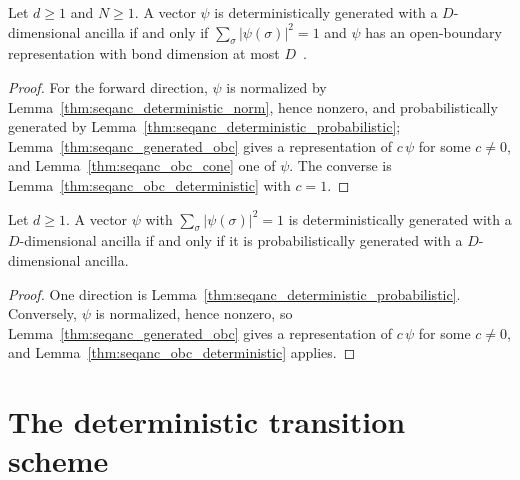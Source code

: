 \begin{theorem}
    \label{thm:seqanc_deterministic}
    \leanok
    Let $d\ge 1$ and $N\ge 1$. A vector $\psi$ is deterministically generated
    with a $D$-dimensional ancilla if and only if $\sum_\sigma|\psi(\sigma)|^2=1$
    and $\psi$ has an open-boundary representation with bond dimension at
    most $D$~\cite[Section~5,
        Theorem ``Sequential generation with ancilla'']{PerezGarcia2007Matrix}.
\end{theorem}
\begin{proof}
    \leanok
    For the forward direction, $\psi$ is normalized by
    Lemma~\ref{thm:seqanc_deterministic_norm}, hence nonzero, and
    probabilistically generated by
    Lemma~\ref{thm:seqanc_deterministic_probabilistic};
    Lemma~\ref{thm:seqanc_generated_obc} gives a representation of
    $c\,\psi$ for some $c\ne 0$, and Lemma~\ref{thm:seqanc_obc_cone} one of
    $\psi$. The converse is Lemma~\ref{thm:seqanc_obc_deterministic} with
    $c=1$.
\end{proof}

\begin{lemma}
    \label{thm:seqanc_det_iff_prob}
    \leanok
    Let $d\ge 1$. A vector $\psi$ with $\sum_\sigma|\psi(\sigma)|^2=1$ is
    deterministically generated with a $D$-dimensional ancilla if and only if
    it is probabilistically generated with a $D$-dimensional ancilla.
\end{lemma}
\begin{proof}
    \leanok
    One direction is Lemma~\ref{thm:seqanc_deterministic_probabilistic}.
    Conversely, $\psi$ is normalized, hence nonzero, so
    Lemma~\ref{thm:seqanc_generated_obc} gives a representation of
    $c\,\psi$ for some $c\ne 0$, and
    Lemma~\ref{thm:seqanc_obc_deterministic} applies.
\end{proof}

\section{The deterministic transition scheme}

